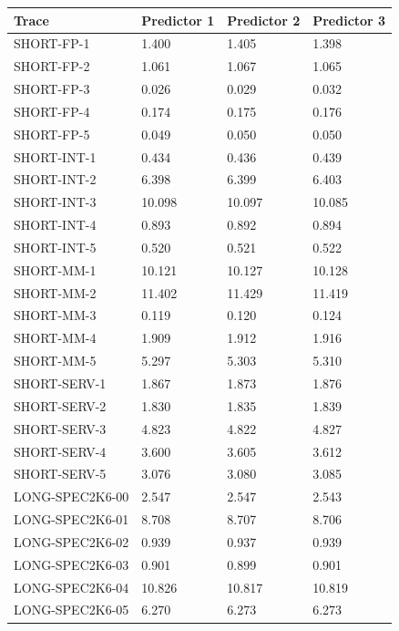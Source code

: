 \documentclass{article}
\begin{document}
\begin{table}[h]
    \centering
    \begin{tabular}{llll}
        \toprule
        \textbf{Trace} & \textbf{Predictor 1} & \textbf{Predictor 2} & \textbf{Predictor 3} \\
        \midrule
        SHORT-FP-1  & 1.400 & 1.405 & 1.398 \\
        SHORT-FP-2  & 1.061 & 1.067 & 1.065 \\
        SHORT-FP-3  & 0.026 & 0.029 & 0.032 \\
        SHORT-FP-4  & 0.174 & 0.175 & 0.176 \\
        SHORT-FP-5  & 0.049 & 0.050 & 0.050 \\
        SHORT-INT-1  & 0.434 & 0.436 & 0.439 \\
        SHORT-INT-2  & 6.398 & 6.399 & 6.403 \\
        SHORT-INT-3  & 10.098 & 10.097 & 10.085 \\
        SHORT-INT-4  & 0.893 & 0.892 & 0.894 \\
        SHORT-INT-5  & 0.520 & 0.521 & 0.522 \\
        SHORT-MM-1  & 10.121 & 10.127 & 10.128 \\
        SHORT-MM-2  & 11.402 & 11.429 & 11.419 \\
        SHORT-MM-3  & 0.119 & 0.120 & 0.124 \\
        SHORT-MM-4  & 1.909 & 1.912 & 1.916 \\
        SHORT-MM-5  & 5.297 & 5.303 & 5.310 \\
        SHORT-SERV-1  & 1.867 & 1.873 & 1.876 \\
        SHORT-SERV-2  & 1.830 & 1.835 & 1.839 \\
        SHORT-SERV-3  & 4.823 & 4.822 & 4.827 \\
        SHORT-SERV-4  & 3.600 & 3.605 & 3.612 \\
        SHORT-SERV-5  & 3.076 & 3.080 & 3.085 \\
        LONG-SPEC2K6-00  & 2.547 & 2.547 & 2.543 \\
        LONG-SPEC2K6-01  & 8.708 & 8.707 & 8.706 \\
        LONG-SPEC2K6-02  & 0.939 & 0.937 & 0.939 \\
        LONG-SPEC2K6-03  & 0.901 & 0.899 & 0.901 \\
        LONG-SPEC2K6-04  & 10.826 & 10.817 & 10.819 \\
        LONG-SPEC2K6-05  & 6.270 & 6.273 & 6.273 \\

\end{tabular}
\end{table}
\end{document}
